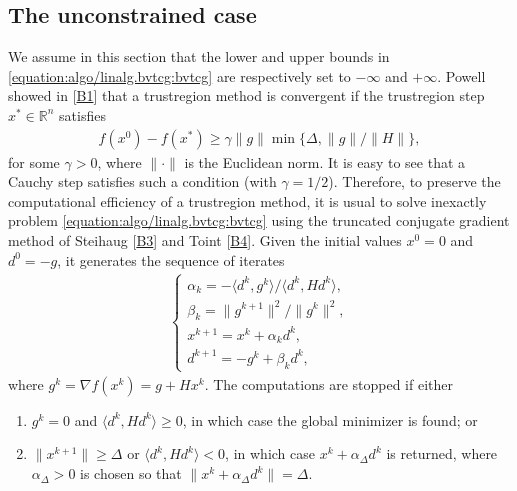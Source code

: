\documentclass[letterpaper,10pt,english]{sphinxmanual}
\newcommand{\norm}[2][]{#1\lVert#2#1\rVert}
\newcommand{\set}[2][]{#1\{#2#1\}}
\newcommand{\inner}[2][]{#1\langle#2#1\rangle}
\def\R{\ensuremath{\mathds{R}}}
\begin{document}
\subsection{The unconstrained case}
\label{\detokenize{algo/linalg.bvtcg:the-unconstrained-case}}\label{\detokenize{algo/linalg.bvtcg:tcg-base}}
\sphinxAtStartPar
We assume in this section that the lower and upper bounds in \eqref{equation:algo/linalg.bvtcg:bvtcg} are
respectively set to \(-\infty\) and \(+\infty\). Powell showed in
{[}\hyperlink{cite.algo/linalg.bvtcg:cite-1-bvtcg-powell-1975}{B1}{]} that a trust\sphinxhyphen{}region method is convergent if the
trust\sphinxhyphen{}region step \(x^{\ast} \in \R^n\) satisfies
\begin{equation*}
\begin{split}f(x^0) - f(x^{\ast}) \ge \gamma \norm{g} \min \set{\Delta, \norm{g} / \norm{H}},\end{split}
\end{equation*}
\sphinxAtStartPar
for some \(\gamma > 0\), where \(\norm{\cdot}\) is the Euclidean norm.
It is easy to see that a Cauchy step satisfies such a condition
(with \(\gamma = 1/2\)). Therefore, to preserve the computational
efficiency of a trust\sphinxhyphen{}region method, it is usual to solve inexactly problem
\eqref{equation:algo/linalg.bvtcg:bvtcg} using the truncated conjugate gradient method of Steihaug
{[}\hyperlink{cite.algo/linalg.bvtcg:cite-1-bvtcg-steihaug-1983}{B3}{]} and Toint {[}\hyperlink{cite.algo/linalg.bvtcg:cite-1-bvtcg-toint-1981}{B4}{]}. Given the
initial values \(x^0 = 0\) and \(d^0 = -g\), it generates the sequence
of iterates
\begin{equation*}
\begin{split}\left\{
\begin{array}{l}
    \alpha_k = -\inner{d^k, g^k} / \inner{d^k, Hd^k},\\
    \beta_k = \norm{g^{k + 1}}^2 / \norm{g^k}^2,\\
    x^{k + 1} = x^k + \alpha_k d^k,\\
    d^{k + 1} = -g^k + \beta_k d^k,
\end{array}
\right.\end{split}
\end{equation*}
\sphinxAtStartPar
where \(g^k = \nabla f(x^k) = g + Hx^k\). The computations are stopped if
either
\begin{enumerate}
%
\item {} 
\sphinxAtStartPar
\(g^k = 0\) and \(\inner{d^k, Hd^k} \ge 0\), in which case the
global minimizer is found; or

\item {} 
\sphinxAtStartPar
\(\norm{x^{k + 1}} \ge \Delta\) or \(\inner{d^k, Hd^k} < 0\), in
which case \(x^k + \alpha_{\Delta} d^k\) is returned, where
\(\alpha_{\Delta} > 0\) is chosen so that
\(\norm{x^k + \alpha_{\Delta} d^k} = \Delta\).

\end{enumerate}
\end{document}
